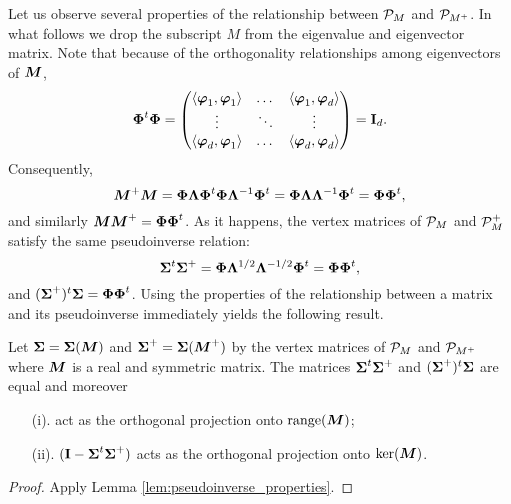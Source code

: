 Let us observe several properties of the relationship between $\P_M$ and $\P_{M^+}$. In what follows we drop the subscript $M$ from the eigenvalue and eigenvector matrix. Note that because of the orthogonality relationships among eigenvectors of $\M$, 
\[\Eig^\tp \Eig = \begin{pmatrix}
\la \vp_1,\vp_1\ra & \dots & \la \vp_1,\vp_d \ra \\
\vdots & \ddots & \vdots \\
\la \vp_d,\vp_1\ra & \dots & \la \vp_d,\vp_d\ra
\end{pmatrix} = \I_d.\]
Consequently, 
\begin{equation*}
\M^+\M = \Eig\Eval\Eig^\tp \Eig\Eval^{-1}\Eig^\tp = \Eig\Eval\Eval^{-1}\Eig^\tp = \Eig\Eig^\tp,
\end{equation*}
and similarly $\M\M^+= \Eig\Eig^\tp$. As it happens, the vertex matrices of $\P_M$ and $\P_M^+$ satisfy the same pseudoinverse relation: 
\begin{equation*}
\Sv^\tp\Sv^+ = \Eig \Eval^{1/2}\Eval^{-1/2}\Eig^\tp = \Eig\Eig^\tp, 
\end{equation*}
and $(\Sv^+)^\tp\Sv = \Eig\Eig^\tp$. Using the properties of the relationship between a matrix and its pseudoinverse immediately yields the following result. 

\begin{lemma}
\label{lem:vertex_matrices_pseudoinverse}
	Let $\Sv=\Sv(\M)$ and $\Sv^+=\Sv(\M^+)$ by the vertex matrices of $\P_M$ and $\P_{M^+}$ where $\M$ is a real and symmetric matrix. The matrices $\Sv^\tp\Sv^+$ and $(\Sv^+)^\tp\Sv$ are equal and moreover 
	\begin{enumerate}
		\item[(i).] act as the orthogonal projection onto $\range(\M)$;
		\item[(ii).] $(\I-\Sv^\tp\Sv^+)$ acts as the orthogonal projection onto $\ker(\M)$. 
	\end{enumerate}
\end{lemma}
\begin{proof}
	Apply Lemma \ref{lem:pseudoinverse_properties}. 
\end{proof}

